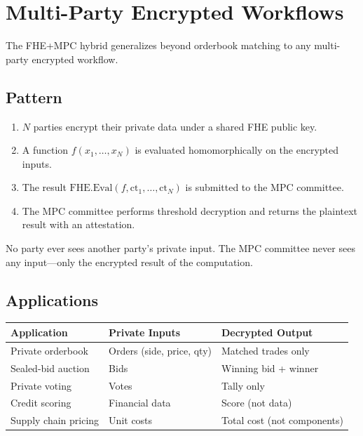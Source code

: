 \section{Multi-Party Encrypted Workflows}


The FHE+MPC hybrid generalizes beyond orderbook matching to any multi-party encrypted workflow.

\subsection{Pattern}

\begin{enumerate}[leftmargin=2em]
\item $N$ parties encrypt their private data under a shared FHE public key.
\item A function $f(x_1, \ldots, x_N)$ is evaluated homomorphically on the encrypted inputs.
\item The result $\text{FHE.Eval}(f, \text{ct}_1, \ldots, \text{ct}_N)$ is submitted to the MPC committee.
\item The MPC committee performs threshold decryption and returns the plaintext result with an attestation.
\end{enumerate}

No party ever sees another party's private input. The MPC committee never sees any input---only the encrypted result of the computation.

\subsection{Applications}

\begin{center}
\begin{tabular}{lll}
\toprule
\textbf{Application} & \textbf{Private Inputs} & \textbf{Decrypted Output} \\
\midrule
Private orderbook & Orders (side, price, qty) & Matched trades only \\
Sealed-bid auction & Bids & Winning bid + winner \\
Private voting & Votes & Tally only \\
Credit scoring & Financial data & Score (not data) \\
Supply chain pricing & Unit costs & Total cost (not components) \\
\bottomrule
\end{tabular}
\end{center}

